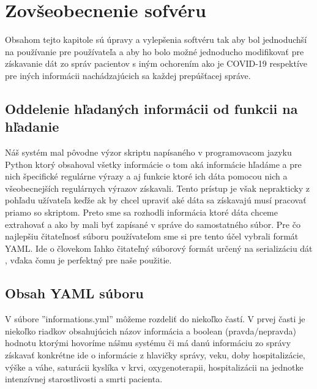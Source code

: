 \chapter{Zovšeobecnenie sofvéru}

Obsahom tejto kapitole sú úpravy a vylepšenia softvéru tak aby bol jednoduchší na používanie pre používateľa a aby ho bolo možné jednoducho modifikovať pre získavanie dát zo správ pacientov s iným ochorením ako je COVID-19 respektíve pre iných informácii nachádzajúcich sa každej prepúšťacej správe.  

\section{Oddelenie hľadaných informácii od funkcii na hľadanie}

Náš systém mal pôvodne výzor skriptu napísaného v programovacom jazyku Python ktorý obsahoval všetky informácie o tom aká informácie hľadáme a pre nich špecifické regulárne výrazy a aj funkcie ktoré ich dáta pomocou nich a všeobecnejších regulárnych výrazov získavali. Tento prístup je však neprakticky z pohľadu užívateľa keďže ak by chcel upraviť aké dáta sa získavajú musí pracovať priamo so skriptom. Preto sme sa rozhodli informácia ktoré dáta chceme extrahovať a ako by mali byť zapísané v správe do samostatného súbor. Pre čo najlepšiu čitateľnosť súboru používateľom sme si pre tento účel vybrali formát YAML. Ide o človekom ľahko čitateľný súborový formát určený na serializáciu dát \cite{YAML}, vďaka čomu je perfektný pre naše použitie. 

\section{Obsah YAML súboru}

V súbore ''informations.yml'' môžeme rozdeliť do niekoľko častí. V prvej časti je niekoľko riadkov obsahujúcich názov informácia a boolean (pravda/nepravda) hodnotu ktorými hovoríme nášmu systému či má danú informáciu zo správy získavať konkrétne ide o informácie z hlavičky správy, veku, doby hospitalizácie, výške a váhe, saturácii kyslíka v krvi, oxygenoterapii, hospitalizácii na jednotke intenzívnej starostlivosti a smrti pacienta.